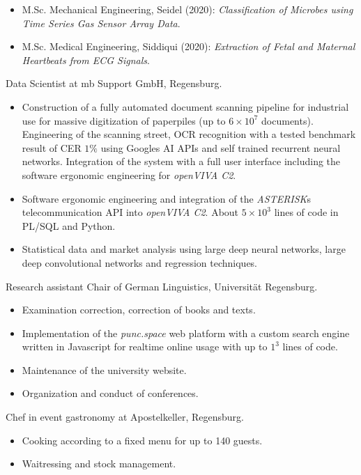 \documentclass[a4paper, 11pt]{article}
\newcommand{\years}[1]{\marginnote{\scriptsize #1}}
\begin{document}
\begin{itemize}
\begin{itemize}[noitemsep, leftmargin=*]
\begin{itemize}
						\item M.Sc. Mechanical Engineering, Seidel (2020): \emph{Classification of
							Microbes using Time Series Gas Sensor Array Data}.

						\item M.Sc. Medical Engineering, Siddiqui (2020): \emph{Extraction of
							Fetal and Maternal Heartbeats from ECG Signals}.
					\end{itemize}
			\end{itemize}
	\end{itemize}
	\years{2015--18} Data Scientist at mb Support GmbH, Regensburg.
	\begin{itemize}
		\item Construction of a fully automated document scanning pipeline for industrial use for massive digitization of paperpiles (up to $6 \times 10^7$ documents). Engineering of the scanning street, OCR recognition with a tested benchmark result of CER $1\%$ using Googles AI APIs and self trained recurrent neural networks. Integration of the system with a full user interface including the software ergonomic engineering for \emph{openVIVA C2}.

		\item Software ergonomic engineering and integration of the \emph{ASTERISK}s telecommunication API into \emph{openVIVA C2}. About $5 \times 10^3$ lines of code in PL/SQL and Python.

		\item Statistical data and market analysis using large deep neural networks, large deep convolutional networks and regression techniques.
	\end{itemize}
	\years{2013--15} Research assistant Chair of German Linguistics, Universität
	Regensburg.
	\begin{itemize}
		\item Examination correction, correction of books and texts.

		\item Implementation of the \emph{punc.space} web platform with a custom search engine written in Javascript for realtime online usage with up to $1^3$ lines of code.

		\item Maintenance of the university website.

		\item Organization and conduct of conferences.
	\end{itemize}
	\years{2012--15} Chef in event gastronomy at Apostelkeller, Regensburg.
	\begin{itemize}
		\item Cooking according to a fixed menu for up to 140 guests.

		\item Waitressing and stock management.
	\end{itemize}
\end{document}
